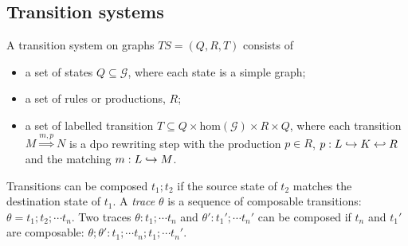 
\subsection{Transition systems}
\label{sec:ts}

\begin{definition}[TS on graphs]
  A transition system on graphs $TS = (Q,R,T)$ consists of
  \begin{itemize}
  \item a set of states $Q\subseteq \mathcal{G}$, where each state is a simple graph;
  \item a set of rules or productions, $R$;
  \item a set of labelled transition $T\subseteq Q\times \text{hom}(\mathcal{G})\times R\times Q$, where each transition $M \overset{m,p}{\Rightarrow} N$ is a dpo rewriting step with the production $p\in R$, $p:L\hookrightarrow K\hookleftarrow R$ and the matching $m:L\hookrightarrow M$.
  \end{itemize}
\end{definition}

Transitions can be composed $t_1;t_2$ if the source state of $t_2$ matches the destination state of $t_1$. A \emph{trace} $\theta$ is a sequence of composable transitions: $\theta=t_1;t_2;\cdots t_n$. Two traces $\theta:t_1;\cdots t_n$ and $\theta':t_1';\cdots t_n'$ can be composed if $t_n$ and $t_1'$ are composable: $\theta;\theta':t_1;\cdots t_n;t_1;\cdots t_n'$.

